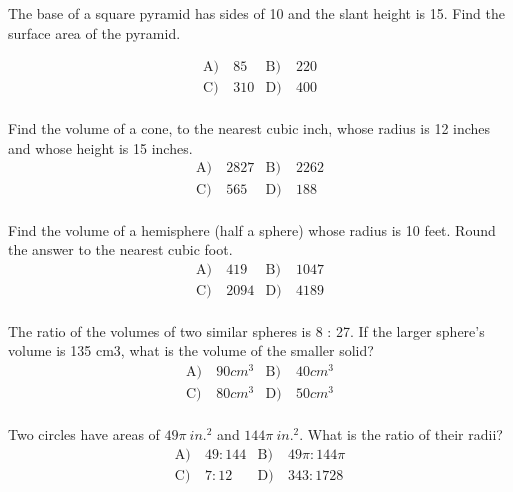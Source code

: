 \begin{problem}\label{Geo39}
The base of a square pyramid has sides of 10 and the slant height is 15.  Find the surface area of the pyramid.

\begin{align*}
\text{A)}\ & 85 &
\text{B)}\ & 220  \\
\text{C)}\ & 310 &
\text{D)}\ & 400\\
\end{align*}    
\end{problem}


\begin{problem}\label{Geo40}
 Find the volume of a cone, to the nearest cubic inch, whose radius is 12 inches and whose height is 15 inches.
\begin{align*}
\text{A)}\ & 2827 &
\text{B)}\ & 2262  \\
\text{C)}\ & 565 &
\text{D)}\ & 188\\
\end{align*}    
\end{problem}


\begin{problem}\label{Geo41}
Find the volume of a hemisphere (half a sphere) whose radius is 10 feet.  Round the answer to the nearest cubic foot.
\begin{align*}
\text{A)}\ & 419 &
\text{B)}\ & 1047  \\
\text{C)}\ & 2094 &
\text{D)}\ & 4189\\
\end{align*}    
\end{problem}


\begin{problem}\label{Geo43}
The ratio of the volumes of two similar spheres is 8 : 27.  If the larger sphere’s volume is 135 cm3, what is the volume of the smaller solid?
\begin{align*}
\text{A)}\ & 90{cm}^3 &
\text{B)}\ & 40{cm}^3  \\
\text{C)}\ & 80cm^3 &
\text{D)}\ & 50cm^3\\
\end{align*}    
\end{problem}


\begin{problem}\label{Geo44}
Two circles have areas of $49\pi \ in.^2$ and $144\pi\  in.^2$. What is the ratio of their radii? 
\begin{align*}
\text{A)}\ & 49:144 &
\text{B)}\ & 49\pi:144\pi  \\
\text{C)}\ & 7:12 &
\text{D)}\ & 343:1728\\
\end{align*}    
\end{problem}








